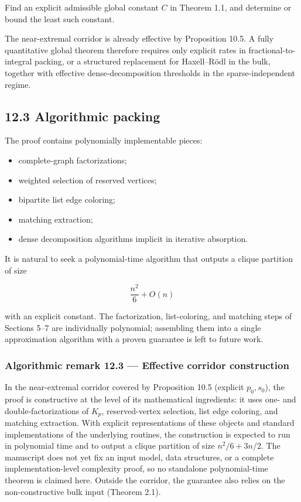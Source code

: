\documentclass[english,11pt,a4paper]{article}
\providecommand{\tightlist}{\setlength{\itemsep}{0pt}\setlength{\parskip}{0pt}}
\begin{document}
Find an explicit admissible global constant \(C\) in Theorem 1.1, and
determine or bound the least such constant.

The near-extremal corridor is already effective by Proposition 10.5. A
fully quantitative global theorem therefore requires only explicit rates
in fractional-to-integral packing, or a structured replacement for
Haxell--Rödl in the bulk, together with effective dense-decomposition
thresholds in the sparse-independent regime.

\subsection{12.3 Algorithmic packing}\label{algorithmic-packing}

The proof contains polynomially implementable pieces:

\begin{itemize}
\tightlist
\item
  complete-graph factorizations;
\item
  weighted selection of reserved vertices;
\item
  bipartite list edge coloring;
\item
  matching extraction;
\item
  dense decomposition algorithms implicit in iterative absorption.
\end{itemize}

It is natural to seek a polynomial-time algorithm that outputs a clique
partition of size

\[
\frac{n^2}{6}+O(n)
\]

with an explicit constant. The factorization, list-coloring, and
matching steps of Sections 5--7 are individually polynomial; assembling
them into a single approximation algorithm with a proven guarantee is
left to future work.

\subsubsection{Algorithmic remark 12.3 --- Effective corridor
construction}\label{algorithmic-remark-12.3-effective-corridor-construction}

In the near-extremal corridor covered by Proposition 10.5 (explicit
\(p_0,s_0\)), the proof is constructive at the level of its mathematical
ingredients: it uses one- and double-factorizations of \(K_p\),
reserved-vertex selection, list edge coloring, and matching extraction.
With explicit representations of these objects and standard
implementations of the underlying routines, the construction is expected
to run in polynomial time and to output a clique partition of size
\(n^2/6+3n/2\). The manuscript does not yet fix an input model, data
structures, or a complete implementation-level complexity proof, so no
standalone polynomial-time theorem is claimed here. Outside the
corridor, the guarantee also relies on the non-constructive bulk input
(Theorem 2.1).
\end{document}
